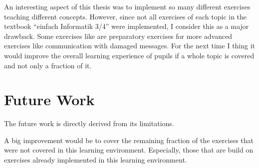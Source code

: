 An interesting aspect of this thesis was to implement so many different exercises teaching different concepts. However, since not all exercises of each topic in the textbook “einfach Informatik 3/4” were implemented, I consider this as a major drawback. Some exercises like  are preparatory exercises for more advanced exercises like communication with damaged messages. For the next time I thing it would improve the overall learning experience of pupils if a whole topic is covered and not only a fraction of it.


\section{Future Work}
\label{section:futureWork}

The future work is directly derived from its limitations.

A big improvement would be to cover the remaining fraction of the exercises that were not covered in this learning environment. Especially, those that are build on exercises already implemented in this learning environment.

